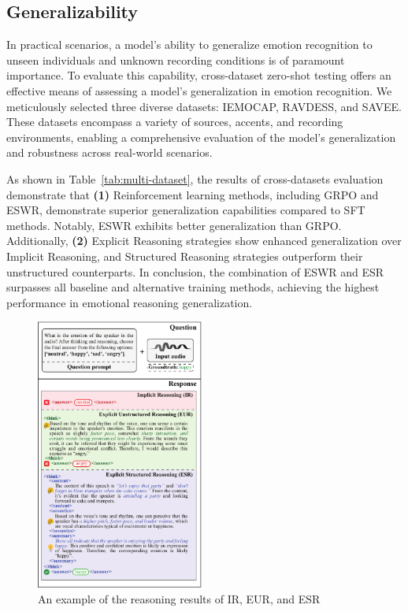 \documentclass[11pt]{article}
\begin{document}
\subsection{Generalizability}
In practical scenarios, a model's ability to generalize emotion recognition to unseen individuals and unknown recording conditions is of paramount importance.
To evaluate this capability, cross-dataset zero-shot testing offers an effective means of assessing a model's generalization in emotion recognition.
We meticulously selected three diverse datasets: IEMOCAP, RAVDESS, and SAVEE.
These datasets encompass a variety of sources, accents, and recording environments, enabling a comprehensive evaluation of the model's generalization and robustness across real-world scenarios.

As shown in Table~\ref{tab:multi-dataset}, the results of cross-datasets evaluation demonstrate that \textbf{(1)} Reinforcement learning methods, including GRPO and ESWR, demonstrate superior generalization capabilities compared to SFT methods. Notably, ESWR exhibits better generalization than GRPO. Additionally,
\textbf{(2)} Explicit Reasoning strategies show enhanced generalization over Implicit Reasoning, and Structured Reasoning strategies outperform their unstructured counterparts.
In conclusion, the combination of ESWR and ESR surpasses all baseline and alternative training methods, achieving the highest performance in emotional reasoning generalization.
\begin{figure}[t]
	\centering
	\includegraphics[width=0.49\textwidth]{img/answers.pdf}
	\caption{An example of the reasoning results of IR, EUR, and ESR}
	\label{fig:case_study}
	\vspace{-0.5cm}
\end{figure}
\end{document}

